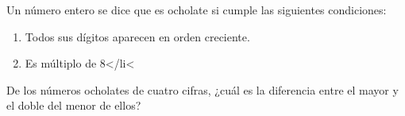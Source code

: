 Un número entero se dice que es ocholate si cumple las siguientes condiciones: 
 \begin{enumerate} 
 \item Todos sus dígitos aparecen en orden creciente.
 \item Es múltiplo de 8</li<
 \end{enumerate} 
De los números ocholates de cuatro cifras, ¿cuál es la diferencia entre el mayor y el doble del menor de ellos?
